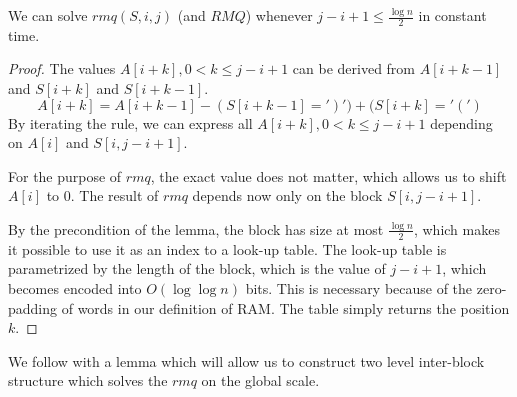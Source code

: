 \begin{lemma}
We can solve $rmq(S, i, j)$ (and $RMQ$) whenever $j - i + 1 \le \frac{\log n}{2}$ in constant time.
\end{lemma}
\begin{proof}
The values $A[i + k], 0 < k \le j - i + 1 $ can be derived from $A[i + k - 1]$ and $S[i + k]$ and $S[i + k - 1]$.
$$A[i + k] = A[i + k - 1] - (S[i + k - 1] = ')') + (S[i + k] = '(')$$
By iterating the rule, we can express all $A[i + k], 0 < k \le j - i + 1 $ depending on $A[i]$ and $S[i, j - i + 1]$.

For the purpose of $rmq$, the exact value does not matter, which allows us to shift $A[i]$ to $0$.
The result of $rmq$ depends now only on the block $S[i, j - i + 1]$.

By the precondition of the lemma, the block has size at most $\frac{\log n}{2}$, which makes it possible to use it as an index to a look-up table.
The look-up table is parametrized by the length of the block, which is the value of $j - i + 1$, which becomes encoded into $O(\log \log n)$ bits.
This is necessary because of the zero-padding of words in our definition of RAM.
The table simply returns the position $k$.
\end{proof}

We follow with a lemma which will allow us to construct two level inter-block structure which solves the $rmq$ on the global scale.

